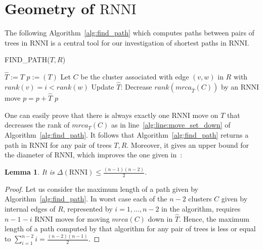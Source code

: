 \documentclass[11pt, a4paper]{article}
\newcommand{\rnni}{\mathrm{RNNI}}
\newtheorem{lemma}[definition]{Lemma}
\begin{document}





\section{Geometry of $\rnni$}

The following Algorithm~\ref{alg:find_path} which computes paths between pairs of trees in $\rnni$ is a central tool for our investigation of shortest paths in $\rnni$.

\begin{algorithm}[H]
\caption{FIND\_PATH($T,R$)}
\label{alg:find_path}
\begin{algorithmic}[1]
	\STATE $\hat{T} := T$
	\STATE $p := (T)$
		\STATE Let $C$ be the cluster associated with edge $(v,w)$ in $R$ with $rank(v) = i < rank(w)$
			\STATE Update $\hat{T}$: Decrease $rank(mrca_{\hat{T}}(C))$ by an $\rnni$ move \label{alg:line:move_set_down}
			\STATE $p = p+\hat{T}$
		\ENDWHILE
	\ENDFOR
	\RETURN $p$
\end{algorithmic}
\end{algorithm}


One can easily prove that there is always exactly one $\rnni$ move on $T$ that decreases the rank of $mrca_T(C)$ as in line~\ref{alg:line:move_set_down} of Algorithm~\ref{alg:find_path}.
It follows that Algorithm~\ref{alg:find_path} returns a path in $\rnni$ for any pair of trees $T,R$.
Moreover, it gives an upper bound for the diameter of $\rnni$, which improves the one given in~\cite{Gavryushkin2017}:

\begin{lemma}
    It is $\Delta(\rnni) \leq \frac{(n-1)(n-2)}{2}$.
\end{lemma}

\begin{proof}
    Let us consider the maximum length of a path given by Algorithm~\ref{alg:find_path}.
    In worst case each of the $n-2$ clusters $C$ given by internal edges of $R$, represented by $i = 1, \dots, n-2$ in the algorithm, requires $n-1-i$ $\rnni$ moves for moving $mrca(C)$ down in $\hat{T}$.
	Hence, the maximum length of a path computed by that algorithm for any pair of trees is less or equal to $\sum\limits_{i = 1}^{n-2} i = \frac{(n-2)(n-1)}{2}$.
\end{proof}
\end{document}
